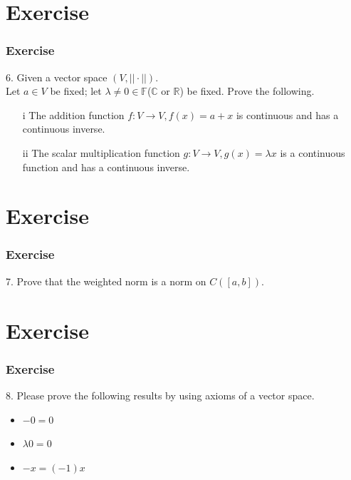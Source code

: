 \documentclass[12pt, t]{beamer}
\begin{document}
\section{Exercise}
\begin{frame}
    \frametitle{Exercise}
    6. Given a vector space $(V,||\cdot||)$.\\
    Let $a\in V$ be fixed; let $\lambda\neq 0\in \mathbb{F}$($\mathbb{C}$ or $\mathbb{R}$) be fixed. Prove the following.
    \begin{enumerate}
        \item[i]    The addition function $f:V\rightarrow V,f(x)=a+x$ is continuous and has a continuous inverse.
        \item[ii]  The scalar multiplication function $g:V\rightarrow V, g(x)=\lambda x$ is a continuous function and has a continuous inverse.
    \end{enumerate}
\end{frame}

\section{Exercise}
\begin{frame}
    \frametitle{Exercise}
    7. Prove that the weighted norm is a norm on $C([a,b])$.

\end{frame}

\section{Exercise}
\begin{frame}
    \frametitle{Exercise}
    8. Please prove the following results by using axioms of a vector space.
    \begin{itemize}
        \item $-0=0$
        \item $\lambda 0=0$
        \item $-x=(-1)x$
    \end{itemize}
\end{frame}
\end{document}
